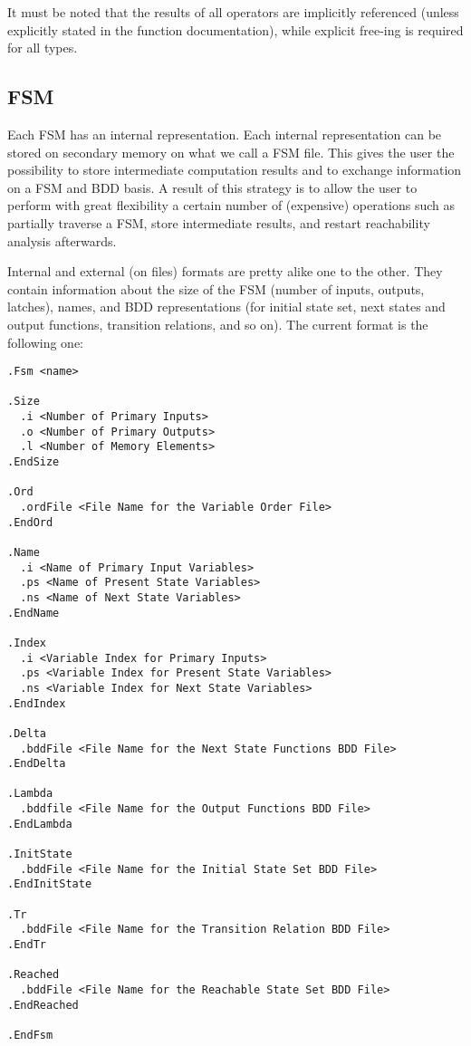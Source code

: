 It must be noted that the results of all operators are implicitly referenced
(unless explicitly stated in the function documentation), while explicit 
free-ing is required for all types.



\subsection{FSM}

Each FSM has an internal representation.
Each internal representation can be stored on secondary memory on what we
call a FSM file.
This gives the user the possibility to store intermediate computation
results and to exchange information on a FSM and BDD basis.
A result of this strategy is to allow the user to perform with great
flexibility a certain number of (expensive) operations such as partially
traverse a FSM, store intermediate results, and restart reachability analysis
afterwards.

Internal and external (on files) formats are pretty alike one to the other.
They contain information about the size of the FSM (number of inputs,
outputs, latches), names, and BDD representations (for initial state set,
next states and output functions, transition relations, and so on).
The current format is the following one:

{\small
\begin{verbatim}
.Fsm <name>

.Size
  .i <Number of Primary Inputs>
  .o <Number of Primary Outputs>
  .l <Number of Memory Elements>
.EndSize

.Ord
  .ordFile <File Name for the Variable Order File>
.EndOrd

.Name
  .i <Name of Primary Input Variables>
  .ps <Name of Present State Variables>
  .ns <Name of Next State Variables>
.EndName

.Index
  .i <Variable Index for Primary Inputs>
  .ps <Variable Index for Present State Variables>
  .ns <Variable Index for Next State Variables>
.EndIndex

.Delta
  .bddFile <File Name for the Next State Functions BDD File>
.EndDelta

.Lambda
  .bddfile <File Name for the Output Functions BDD File>
.EndLambda

.InitState
  .bddFile <File Name for the Initial State Set BDD File>
.EndInitState

.Tr
  .bddFile <File Name for the Transition Relation BDD File>
.EndTr

.Reached
  .bddFile <File Name for the Reachable State Set BDD File>
.EndReached

.EndFsm
\end{verbatim}
}

